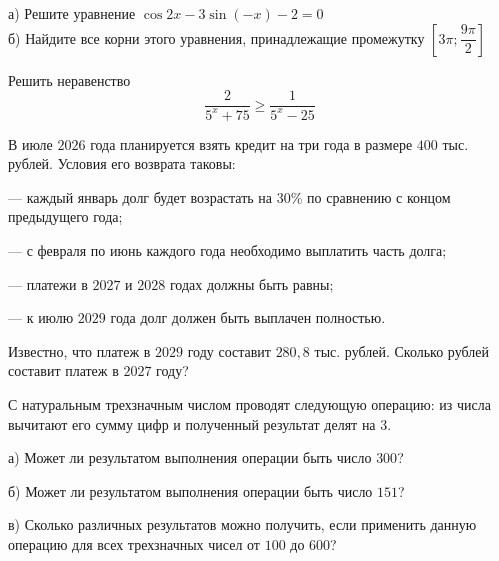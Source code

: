 \begin{listofex}[start=12]
	\item а) Решите уравнение \( \cos2x-3\sin(-x)-2=0 \)\\
	б) Найдите все корни этого уравнения, принадлежащие
	промежутку \( \left[3\pi;\dfrac{9\pi}{2}\right] \)
	\setcounter{listofexi}{13}
	\item Решить неравенство \[ \dfrac{2}{5^x+75}\ge\dfrac{1}{5^x-25} \]
	\item В июле \( 2026 \) года планируется взять кредит на три года
	в размере \( 400 \) тыс. рублей. Условия его возврата таковы:
	
	--- каждый январь долг будет возрастать на 30\% по сравнению с концом предыдущего года;
	
	--- с февраля по июнь каждого года необходимо выплатить часть долга;
	
	--- платежи в \( 2027 \) и \( 2028 \) годах должны быть равны;
	
	--- к июлю \( 2029 \) года долг должен быть выплачен полностью.
	
	Известно, что платеж в \( 2029 \) году составит \( 280,8 \) тыс. рублей. Сколько рублей составит платеж в \( 2027 \) году?
	\setcounter{listofexi}{17}
	\item С натуральным трехзначным числом проводят следующую операцию: из числа вычитают его сумму цифр и полученный результат делят на \( 3 \).
	
	а) Может ли результатом выполнения операции быть число \( 300 \)?
	
	б) Может ли результатом выполнения операции быть число \( 151 \)?
	
	в) Сколько различных результатов можно получить, если применить данную операцию для всех трехзначных чисел от \( 100 \) до \( 600 \)?
	
\end{listofex}